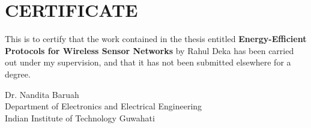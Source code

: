 \chapter*{CERTIFICATE}
This is to certify that the work contained in the thesis entitled \textbf{Energy-Efficient Protocols for Wireless Sensor Networks}
by Rahul Deka has been carried out under my supervision, and that it has not been
submitted elsewhere for a degree.\par
\vspace{1in}
\noindent Dr. Nandita Baruah\\
Department of Electronics and Electrical Engineering\\
Indian Institute of Technology Guwahati
\clearpage
